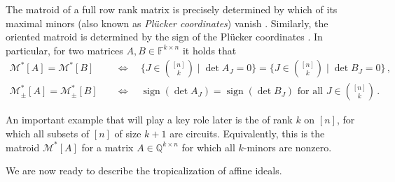 \documentclass[11pt,reqno,a4paper]{amsart}
\numberwithin{equation}{section}
\theoremstyle{theoremstyle}
\theoremstyle{examplestyle}
\newcommand{\QQ}{\mathbb{Q}}
\newcommand{\FF}{\mathbb{F}}
\DeclareMathOperator{\sgn}{sign}
\newcommand{\term}{\bfemph}
\begin{document}
The matroid of a full row rank matrix is precisely determined by which of its maximal minors (also known as \emph{Plücker coordinates}) vanish \cite[Section~6.8]{Oxley}. Similarly, the oriented matroid is determined by the sign of the Plücker coordinates \cite[Section~8.1]{BjornerLasVergnasSturmfelsWhiteZiegler:1999}. In particular, for two matrices $A,B\in \FF^{k\times n}$ it holds that
\begin{align}
  \mathcal{M}^*[A] =   \mathcal{M}^*[B] & \quad \Leftrightarrow \quad \{J\in\textstyle\binom{[n]}{k}  \mid \det A_J = 0\}  =\{J\in\textstyle\binom{[n]}{k}  \mid \det B_J = 0\} \label{eq:matroids_agree}\, ,
  \\ 
   \mathcal{M}^*_\pm[A] =   \mathcal{M}^*_\pm[B]
   & \quad \Leftrightarrow \quad  \sgn(\det A_{J})=\sgn(\det B_{J}) \text{ for all }J\in\textstyle\binom{[n]}{k} \, . \label{eq:signed_matroids_agree}
\end{align}

 
An important example that will play a key role later is the \term{uniform matroid} of rank $k$ on $[n]$, for which all subsets of $[n]$ of size $k+1$ are circuits. Equivalently, this is the matroid $\mathcal{M}^*[A]$ for a matrix $A\in\QQ^{k\times n}$ for which all $k$-minors are nonzero.


We are now ready to describe the tropicalization of affine ideals. 
\end{document}
